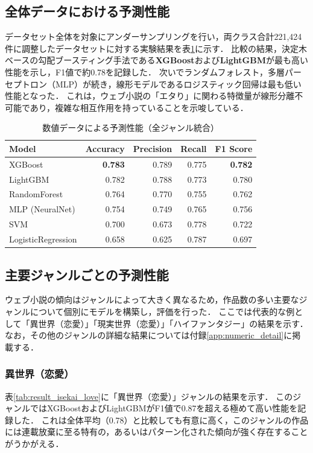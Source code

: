 \documentclass[uplatex, dvipdfmx, 11pt, a4paper, report]{jsbook}
\begin{document}
\subsection{全体データにおける予測性能}
データセット全体を対象にアンダーサンプリングを行い，両クラス合計221,424件に調整したデータセットに対する実験結果を表\ref{tab:result_all}に示す．
比較の結果，決定木ベースの勾配ブースティング手法である\textbf{XGBoost}および\textbf{LightGBM}が最も高い性能を示し，F1値で約0.78を記録した．
次いでランダムフォレスト，多層パーセプトロン（MLP）が続き，線形モデルであるロジスティック回帰は最も低い性能となった．
これは，ウェブ小説の「エタり」に関わる特徴量が線形分離不可能であり，複雑な相互作用を持っていることを示唆している．

\begin{table}[H]
  \centering
  \caption{数値データによる予測性能（全ジャンル統合）}
  \label{tab:result_all}
  \begin{tabular}{lrrrr} \hline
    Model & Accuracy & Precision & Recall & F1 Score \\ \hline
    XGBoost & \textbf{0.783} & 0.789 & 0.775 & \textbf{0.782} \\
    LightGBM & 0.782 & 0.788 & 0.773 & 0.780 \\
    RandomForest & 0.764 & 0.770 & 0.755 & 0.762 \\
    MLP (NeuralNet) & 0.754 & 0.749 & 0.765 & 0.756 \\
    SVM & 0.700 & 0.673 & 0.778 & 0.722 \\
    LogisticRegression & 0.658 & 0.625 & 0.787 & 0.697 \\ \hline
  \end{tabular}
\end{table}

\subsection{主要ジャンルごとの予測性能}
ウェブ小説の傾向はジャンルによって大きく異なるため，作品数の多い主要なジャンルについて個別にモデルを構築し，評価を行った．
ここでは代表的な例として「異世界（恋愛）」「現実世界（恋愛）」「ハイファンタジー」の結果を示す．
なお，その他のジャンルの詳細な結果については付録\ref{app:numeric_detail}に掲載する．

\subsubsection{異世界（恋愛）}
表\ref{tab:result_isekai_love}に「異世界（恋愛）」ジャンルの結果を示す．
このジャンルではXGBoostおよびLightGBMがF1値で0.87を超える極めて高い性能を記録した．
これは全体平均（0.78）と比較しても有意に高く，このジャンルの作品には連載放棄に至る特有の，あるいはパターン化された傾向が強く存在することがうかがえる．
\end{document}
